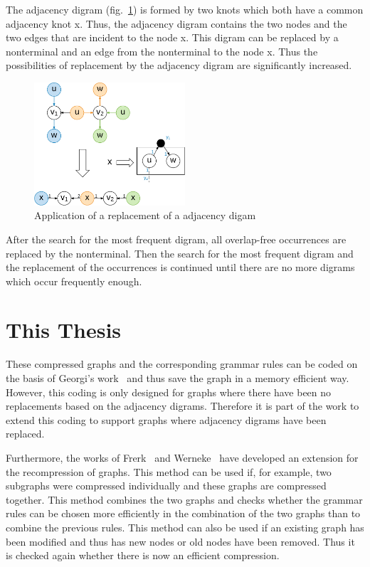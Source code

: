 \documentclass[a4paper]{scrartcl}
\begin{document}
The adjacency digram (fig.~\ref{fig:adjazenzDigram}) is formed by two knots which both have a common adjacency knot x. Thus, the adjacency digram contains the two nodes and the two edges that are incident to the node x. This digram can be replaced by a nonterminal and an edge from the nonterminal to the node x.
Thus the possibilities of replacement by the adjacency digram are significantly increased.


\begin{figure}[h]
	\centering
	\includegraphics[width=0.5\textwidth]{img/adjazenzDigram}
	\caption{Application of a replacement of a adjacency digam}
	\label{fig:adjazenzDigram}
\end{figure}

After the search for the most frequent digram, all overlap-free occurrences are replaced by the nonterminal. Then the search for the most frequent digram and the replacement of the occurrences is continued until there are no more digrams which occur frequently enough.



\section{This Thesis}

These compressed graphs and the corresponding grammar rules can be coded on the basis of Georgi's work~\cite{georgi} and thus save the graph in a memory efficient way. However, this coding is only designed for graphs where there have been no replacements based on the adjacency digrams. Therefore it is part of the work to extend this coding to support graphs where adjacency digrams have been replaced.

Furthermore, the works of Frerk~\cite{pfrerk} and Werneke~\cite{werneke} have developed an extension for the recompression of graphs. This method can be used if, for example, two subgraphs were compressed individually and these graphs are compressed together. This method combines the two graphs and checks whether the grammar rules can be chosen more efficiently in the combination of the two graphs than to combine the previous rules. This method can also be used if an existing graph has been modified and thus has new nodes or old nodes have been removed. Thus it is checked again whether there is now an efficient compression.
\end{document}
